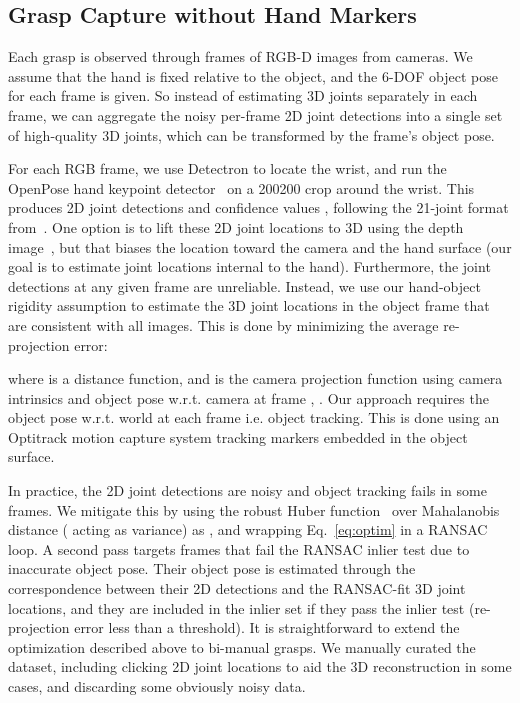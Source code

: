 \documentclass[runningheads]{llncs}
\begin{document}
\subsection{Grasp Capture without Hand Markers}\label{sec:dataset_optim}
Each grasp is observed through  frames of RGB-D images from  cameras. We assume that the hand is fixed relative to the object, and the 6-DOF object pose for each frame is given. So instead of estimating 3D joints separately in each frame, we can aggregate the noisy per-frame 2D joint detections into a single set of high-quality 3D joints, which can be transformed by the frame's object pose.

For each RGB frame, we use Detectron \cite{maskRCNN} to locate the wrist, and run the OpenPose hand keypoint detector~\cite{simon2017hand} on a 200200 crop around the wrist. This produces 2D joint detections  and confidence values , following the 21-joint format from~\cite{simon2017hand}.  One option is to lift these 2D joint locations to 3D using the depth image~\cite{NYUDataset}, but that biases the location toward the camera and the hand surface (our goal is to estimate joint locations internal to the hand). Furthermore, the joint detections at any given frame are unreliable.  Instead, we use our hand-object rigidity assumption to estimate the 3D joint locations  in the object frame that are consistent with all  images. This is done by minimizing the average re-projection error:

where  is a distance function, and  is the camera projection function using camera intrinsics  and object pose w.r.t. camera at frame , . Our approach requires the object pose w.r.t. world at each frame  i.e. object tracking. This is done using an Optitrack motion capture system tracking markers embedded in the object surface.

In practice, the 2D joint detections are noisy and object tracking fails in some frames. We mitigate this by using the robust Huber function~\cite{huber1992robust} over Mahalanobis distance ( acting as variance) as , and wrapping Eq.~\ref{eq:optim} in a RANSAC~\cite{fischler1981random} loop. A second pass targets frames that fail the RANSAC inlier test due to inaccurate object pose. Their object pose is estimated through the correspondence between their 2D detections and the RANSAC-fit 3D joint locations, and they are included in the inlier set if they pass the inlier test (re-projection error less than a threshold). It is straightforward to extend the optimization described above to bi-manual grasps. We manually curated the dataset, including clicking 2D joint locations to aid the 3D reconstruction in some cases, and discarding some obviously noisy data. 
\end{document}
